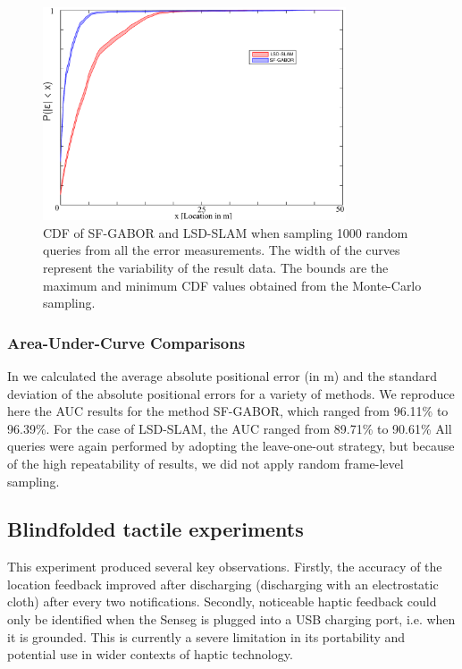 \begin{figure}
\centering
\includegraphics[width=0.8\textwidth]{gfx/Chapter06/SF_GABORvsLSD_SLAM.pdf}
\caption{CDF of SF-GABOR and LSD-SLAM when sampling 1000 random queries from all the error measurements. The width of the curves represent the variability of the result data. The bounds are the maximum and minimum CDF values obtained from the Monte-Carlo sampling.}
\label{fig:cdf}
\end{figure}


\subsubsection{Area-Under-Curve Comparisons}
In \citep{Rivera-Rubio2015PRL} we calculated the average absolute positional error (in m) and the standard deviation of the absolute positional errors for a variety of methods. We reproduce here the AUC results for the method SF-GABOR, which ranged from 96.11\% to 96.39\%. For the case of LSD-SLAM, the AUC ranged from 89.71\% to 90.61\% All queries were again performed by adopting the leave-one-out strategy, but because of the high repeatability of results, we did not apply random frame-level sampling.  

\subsection{Blindfolded tactile experiments}

This experiment produced several key observations.  Firstly, the accuracy of the location feedback improved after discharging (discharging with an electrostatic cloth) after every two notifications. Secondly, noticeable haptic feedback could only be identified when the Senseg is plugged into a USB charging port, i.e. when it is grounded. This is currently a severe limitation in its portability and potential use in wider contexts of haptic technology.

